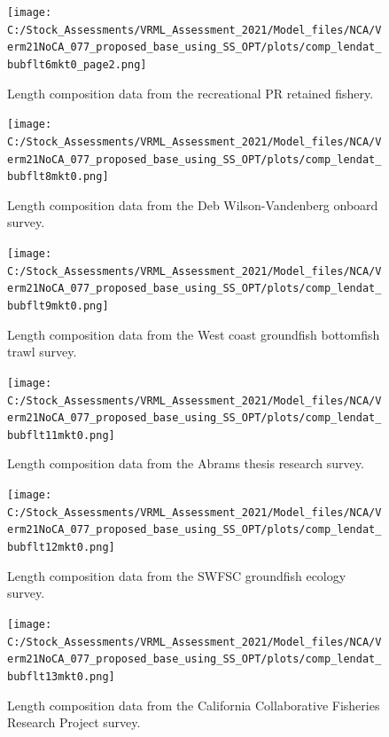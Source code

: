 \documentclass[
  english,
  a4paper,
]{article}
\begin{document}
\begin{figure}
\centering
\texttt{[image: C:/Stock\_Assessments/VRML\_Assessment\_2021/Model\_files/NCA/Verm21NoCA\_077\_proposed\_base\_using\_SS\_OPT/plots/comp\_lendat\_bubflt6mkt0\_page2.png]}
\caption{Length composition data from the recreational PR retained fishery.\label{fig:len-data-REC-PR}}
\end{figure}

\begin{figure}
\centering
\texttt{[image: C:/Stock\_Assessments/VRML\_Assessment\_2021/Model\_files/NCA/Verm21NoCA\_077\_proposed\_base\_using\_SS\_OPT/plots/comp\_lendat\_bubflt8mkt0.png]}
\caption{Length composition data from the Deb Wilson-Vandenberg onboard survey.\label{fig:len-data-DWV-ONBOARD}}
\end{figure}

\begin{figure}
\centering
\texttt{[image: C:/Stock\_Assessments/VRML\_Assessment\_2021/Model\_files/NCA/Verm21NoCA\_077\_proposed\_base\_using\_SS\_OPT/plots/comp\_lendat\_bubflt9mkt0.png]}
\caption{Length composition data from the West coast groundfish bottomfish trawl survey.\label{fig:len-data-NWFSC-TWL}}
\end{figure}

\begin{figure}
\centering
\texttt{[image: C:/Stock\_Assessments/VRML\_Assessment\_2021/Model\_files/NCA/Verm21NoCA\_077\_proposed\_base\_using\_SS\_OPT/plots/comp\_lendat\_bubflt11mkt0.png]}
\caption{Length composition data from the Abrams thesis research survey.\label{fig:len-data-ABRAMS-RESEARCH}}
\end{figure}

\begin{figure}
\centering
\texttt{[image: C:/Stock\_Assessments/VRML\_Assessment\_2021/Model\_files/NCA/Verm21NoCA\_077\_proposed\_base\_using\_SS\_OPT/plots/comp\_lendat\_bubflt12mkt0.png]}
\caption{Length composition data from the SWFSC groundfish ecology survey.\label{fig:len-data-SWFSC-GF-ECOL}}
\end{figure}

\begin{figure}
\centering
\texttt{[image: C:/Stock\_Assessments/VRML\_Assessment\_2021/Model\_files/NCA/Verm21NoCA\_077\_proposed\_base\_using\_SS\_OPT/plots/comp\_lendat\_bubflt13mkt0.png]}
\caption{Length composition data from the California Collaborative Fisheries Research Project survey.\label{fig:len-data-CCFRP}}
\end{figure}
\end{document}
